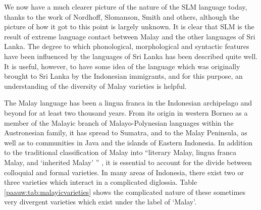 We now have a much clearer picture of the nature of the SLM language today, thanks to the work of Nordhoff, Slomanson, Smith and others, although the picture of how it got to this point is largely unknown. It is clear that SLM is the result of extreme language contact between Malay and the other languages of Sri Lanka. The degree to which phonological, morphological and syntactic features have been influenced by the languages of Sri Lanka has been described quite well. It is useful, however, to have some idea of the language which was originally brought to Sri Lanka by the Indonesian immigrants, and for this purpose, an understanding of the diversity of Malay varieties is helpful.

The Malay language has been a lingua franca in the Indonesian archipelago and beyond for at least two thousand years. From its origin in western Borneo as a member of the Malayic branch of Malayo-Polynesian languages within the Austronesian family, it has spread to Sumatra, and to the Malay Peninsula, as well as to communities in Java and the islands of Eastern Indonesia. In addition to the traditional classification of Malay into ``literary Malay, lingua franca Malay, and `inherited Malay' '' \citep[673]{AdelaarEtAl1996}, it is essential to account for the divide between colloquial and formal varieties. In many areas of Indonesia, there exist two or three varieties which interact in a complicated diglossia. Table \ref{paauw:tab:malayicvarieties} shows the complicated nature of these sometimes very divergent varieties which exist under the label of `Malay'.

